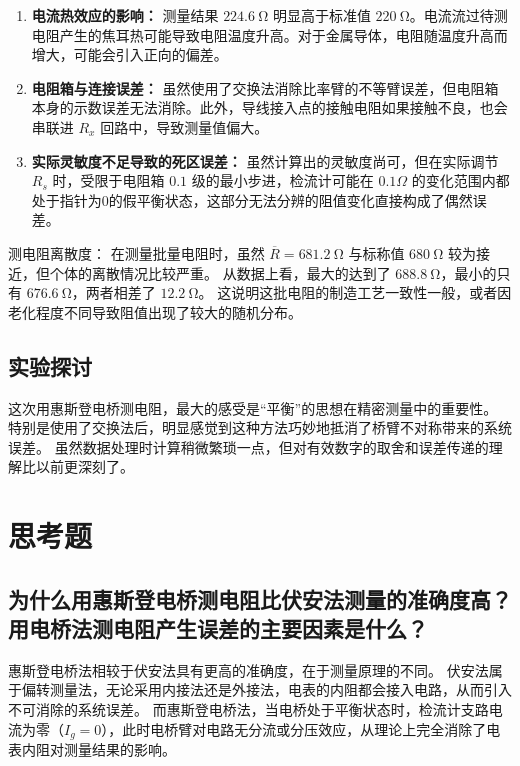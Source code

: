 \documentclass{../../templates/Report}%
\begin{document}
\begin{fullreportonly}
\begin{enumerate}
        \item \textbf{电流热效应的影响：}
              测量结果 $\SI{224.6}{\ohm}$ 明显高于标准值 $\SI{220}{\ohm}$。电流流过待测电阻产生的焦耳热可能导致电阻温度升高。对于金属导体，电阻随温度升高而增大，可能会引入正向的偏差。

        \item \textbf{电阻箱与连接误差：}
              虽然使用了交换法消除比率臂的不等臂误差，但电阻箱本身的示数误差无法消除。此外，导线接入点的接触电阻如果接触不良，也会串联进 $R_x$ 回路中，导致测量值偏大。

        \item \textbf{实际灵敏度不足导致的死区误差：}
              虽然计算出的灵敏度尚可，但在实际调节 $R_s$ 时，受限于电阻箱 $0.1$ 级的最小步进，检流计可能在 $0.1\Omega$ 的变化范围内都处于指针为0的假平衡状态，这部分无法分辨的阻值变化直接构成了偶然误差。
    \end{enumerate}

    测电阻离散度：
    在测量批量电阻时，虽然 $\overline{R} = \SI{681.2}{\ohm}$ 与标称值 $\SI{680}{\ohm}$ 较为接近，但个体的离散情况比较严重。
    从数据上看，最大的达到了 $\SI{688.8}{\ohm}$，最小的只有 $\SI{676.6}{\ohm}$，两者相差了 $\SI{12.2}{\ohm}$。
    这说明这批电阻的制造工艺一致性一般，或者因老化程度不同导致阻值出现了较大的随机分布。
    \subsection{实验探讨}

    这次用惠斯登电桥测电阻，最大的感受是“平衡”的思想在精密测量中的重要性。
    特别是使用了交换法后，明显感觉到这种方法巧妙地抵消了桥臂不对称带来的系统误差。
    虽然数据处理时计算稍微繁琐一点，但对有效数字的取舍和误差传递的理解比以前更深刻了。

    \section{思考题}

    \subsection{为什么用惠斯登电桥测电阻比伏安法测量的准确度高？用电桥法测电阻产生误差的主要因素是什么？}

    惠斯登电桥法相较于伏安法具有更高的准确度，在于测量原理的不同。
    伏安法属于偏转测量法，无论采用内接法还是外接法，电表的内阻都会接入电路，从而引入不可消除的系统误差。
    而惠斯登电桥法，当电桥处于平衡状态时，检流计支路电流为零（$I_g = 0$），此时电桥臂对电路无分流或分压效应，从理论上完全消除了电表内阻对测量结果的影响。


\end{fullreportonly}
\end{document}
